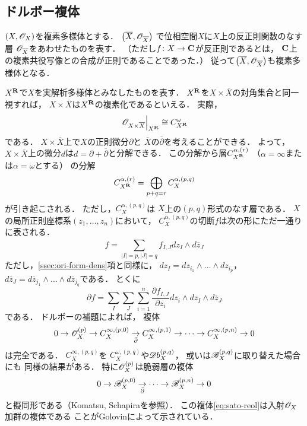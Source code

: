 \subsection{ドルボー複体}

\((X,\mathscr{O}_X)\)を複素多様体とする．
\(\left(\overline{X},\mathscr{O}_{\overline{X}}\right)\)
で位相空間\(X\)に\(X\)上の反正則関数のなす層
\(\mathscr{O}_{\overline{X}}\)をあわせたものを表す．
（ただし\(f\colon X\to \mathbf{C}\)が反正則であるとは，
\(\mathbf{C}\)上の複素共役写像との合成が正則であることであった．）
従って\(\left(\overline{X},\mathscr{O}_{\overline{X}}\right)\)も複素多様体となる．

\(X^{\mathbf{R}}\)で\(X\)を実解析多様体とみなしたものを表す．
\(X^{\mathbf{R}}\)を\(X\times\overline{X}\)の対角集合と同一視すれば，
\(X\times\overline{X}\)は\(X^{\mathbf{R}}\)の複素化であるといえる．
実際，
\begin{equation}
    \left.\mathscr{O}_{X\times\overline{X}}\right\rvert_{X^{\mathbf{R}}}
    \cong
    C^\omega_{X^{\mathbf{R}}}
\end{equation}
である．
\(X\times\overline{X}\)上で\(X\)の正則微分\(\partial\)と
\(\overline{X}\)の\(\overline{\partial}\)を考えることができる．
よって，\(X\times\overline{X}\)上の微分\(d\)は\(
    d={\partial}+\overline{\partial}
\)と分解できる．
この分解から層\(C^{\alpha,(r)}_{X^{\mathbf{R}}}\)
（\(\alpha=\infty\)または\(\alpha=\omega\)とする）
の分解
\[
    C^{\alpha,(r)}_{X^{\mathbf{R}}}
    =\bigoplus_{p+q=r}C^{\alpha,(p,q)}_{X}
\]
が引き起こされる．
ただし，\(C^{\alpha,(p,q)}_{X}\)は
\(X\)上の\((p,q)\)形式のなす層である．
\(X\)の局所正則座標系\((z_1,\dots,z_n)\)において，
\(C^{\alpha,(p,q)}_{X}\)の切断\(f\)は次の形にただ一通りに表される．
\[
    f=\sum_{\lvert I\rvert=p,\lvert J\rvert=q}^{}f_{I,J}dz_I\wedge d\overline{z}_J
\]
ただし，\ref{ssec:ori-form-dens}項と同様に，
\(dz_I=dz_{i_1}\wedge\dots\wedge dz_{i_p}\)，
\(  
    d\overline{z}_J
    =d\overline{z}_{j_1}\wedge\dots\wedge d\overline{z}_{j_q}
\)である．
とくに
\[
    \partial{f}=
    \sum_{I}^{}\sum_{J}^{}\sum_{i=1}^{n}\frac{\partial{f_{I,J}}}{\partial{z_i}}
    dz_i\wedge dz_I\wedge d\overline{z}_J
\]である．
ドルボーの補題によれば，
複体
\[
    0\to\mathscr{O}_X^{(p)}\to C^{\infty,(p,0)}_X
    \underset{\bar{\partial}}{\to}
    C^{\infty,(p,1)}_X\to\dots\to
    C^{\infty,(p,n)}_X\to0
\]
は完全である．
\(C^{\infty,(p,q)}_X\)を
\(C^{\omega,(p,q)}_X\)や\(\mathord{\mathscr{D}b}^{(p,q)}_X\)，
或いは\(\mathscr{B}^{(p,q)}_X\)に取り替えた場合にも
同様の結果がある．
特に\(\mathscr{O}_X^{(p)}\)は脆弱層の複体
\begin{equation}\label{eq:sato-reol}
    0\to\mathscr{B}_X^{(p,0)}
    \underset{\bar{\partial}}{\to}
    \dots\to\mathscr{B}^{(p,n)}_X\to0
\end{equation}
と擬同形である（Komatsu, Schapiraを参照）．
この複体\eqref{eq:sato-reol}は入射\(\mathscr{O}_X\)加群の複体である
ことがGolovinによって示されている．







